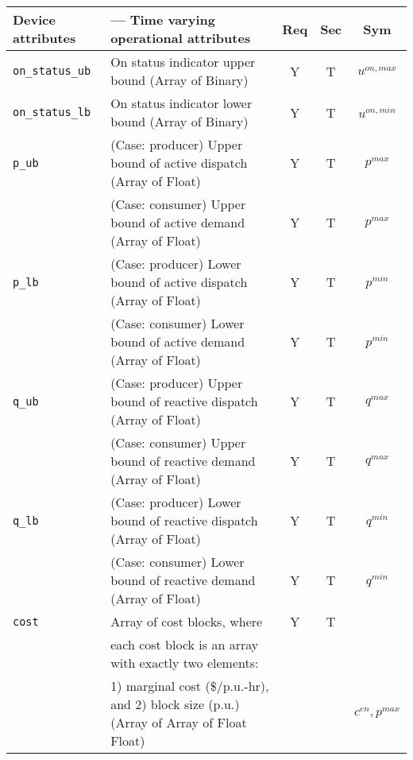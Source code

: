 \documentclass{article}
\begin{document}
\begin{center}
\small
\begin{tabular}{ l | l | c | c | c |}
Device attributes & --- Time varying operational attributes &Req &Sec &Sym \\
\hline
  {\tt on\_status\_ub} & {On status indicator upper bound (Array of Binary)} & Y & T & $u^{on,max}$\\
  {\tt on\_status\_lb} & {On status indicator lower bound (Array of Binary)} & Y & T & $u^{on,min}$\\
  {\tt p\_ub} & { (Case: producer) Upper bound of active dispatch (Array of Float)   }& Y & T & $p^{max}$ \\
              & { (Case: consumer) Upper bound of active demand   (Array of Float)    }& Y & T & $p^{max}$ \\
  {\tt p\_lb} & { (Case: producer) Lower bound of active dispatch (Array of Float)    }& Y & T & $p^{min}$ \\
              & { (Case: consumer) Lower bound of active demand   (Array of Float)    }& Y & T & $p^{min}$ \\
  {\tt q\_ub} & { (Case: producer) Upper bound of reactive dispatch (Array of Float)  }& Y & T & $q^{max}$\\
              & { (Case: consumer) Upper bound of reactive demand   (Array of Float)  }& Y & T & $q^{max}$\\
  {\tt q\_lb} & { (Case: producer) Lower bound of reactive dispatch (Array of Float)  }& Y & T & $q^{min}$\\
              & { (Case: consumer) Lower bound of reactive demand   (Array of Float)  }& Y & T & $q^{min}$\\

  {\tt cost} &  Array of cost blocks, where & Y & T &  \\
    &  each cost block is an array with exactly two elements:   &  &   &  \\
    &  1) marginal  cost (\$/p.u.-hr), and 2) block size (p.u.) (Array of Array of Float Float) &  &   &$c^{en}, p^{max}$ \\
\hline
\end{tabular}
\end{center}
\end{document}
